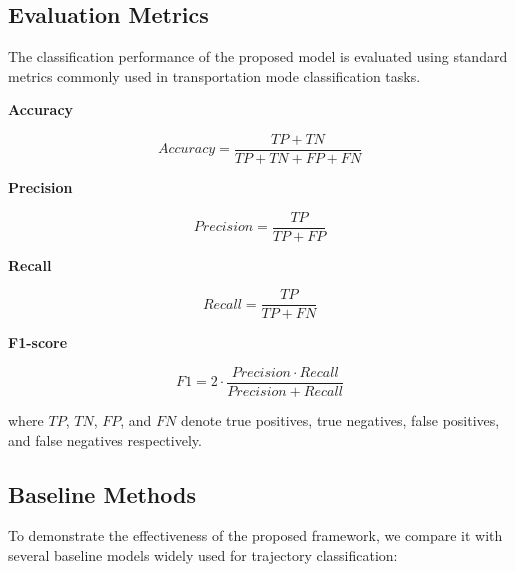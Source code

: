 \documentclass[conference]{IEEEtran}
\begin{document}
\subsection{Evaluation Metrics}

The classification performance of the proposed model is evaluated using standard metrics commonly used in transportation mode classification tasks.

\textbf{Accuracy}

\begin{equation}
Accuracy = \frac{TP + TN}{TP + TN + FP + FN}
\end{equation}

\textbf{Precision}

\begin{equation}
Precision = \frac{TP}{TP + FP}
\end{equation}

\textbf{Recall}

\begin{equation}
Recall = \frac{TP}{TP + FN}
\end{equation}

\textbf{F1-score}

\begin{equation}
F1 = 2 \cdot \frac{Precision \cdot Recall}{Precision + Recall}
\end{equation}

where $TP$, $TN$, $FP$, and $FN$ denote true positives, true negatives, false positives, and false negatives respectively.

\subsection{Baseline Methods}

To demonstrate the effectiveness of the proposed framework, we compare it with several baseline models widely used for trajectory classification:
\end{document}
